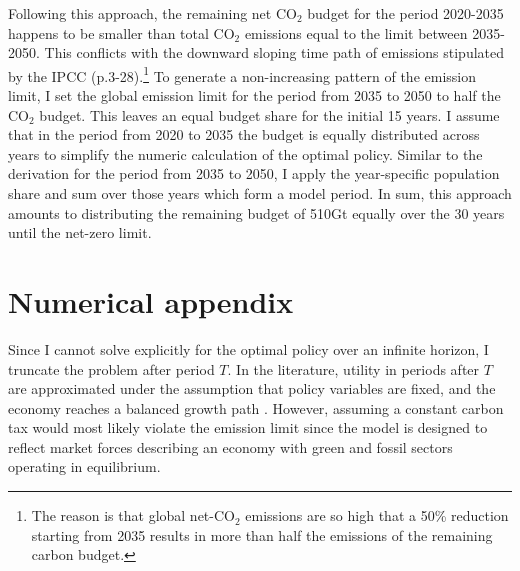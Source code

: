 Following this approach, the remaining net CO$_2$ budget for the period 2020-2035 happens to be smaller than total CO$_2$ emissions equal to the limit between 2035-2050. This conflicts with the downward sloping time path of emissions stipulated by the IPCC (p.3-28).\footnote{ The reason is that global net-CO$_2$ emissions are so high that a 50\% reduction starting from 2035 results in more than half the emissions of the remaining carbon budget.}
To generate a non-increasing pattern of the emission limit, I set the global emission limit for the period from 2035 to 2050 to half the CO$_2$ budget. This leaves an equal budget share for the initial 15 years. I assume that in the period from 2020 to 2035 the budget is equally distributed across years to simplify the numeric calculation of the optimal policy. Similar to the derivation for the period from 2035 to 2050, I apply the year-specific population share and sum over those years which form a model period. In sum, this approach amounts to distributing the remaining budget of 510Gt equally over the 30 years until the net-zero limit.

\section{Numerical appendix}\label{app:PV}

Since I cannot solve explicitly for the optimal policy over an infinite horizon, I truncate the problem after period $T$. 
In the literature, utility in periods after $T$ are approximated under the assumption that policy variables are fixed, and the economy reaches a balanced growth path \citep{Barrage2019OptimalPolicy, Jones1993OptimalGrowth}. However, assuming a constant carbon tax would most likely violate the emission limit since the model is designed to reflect market forces describing an economy with green and fossil sectors operating in equilibrium. 


